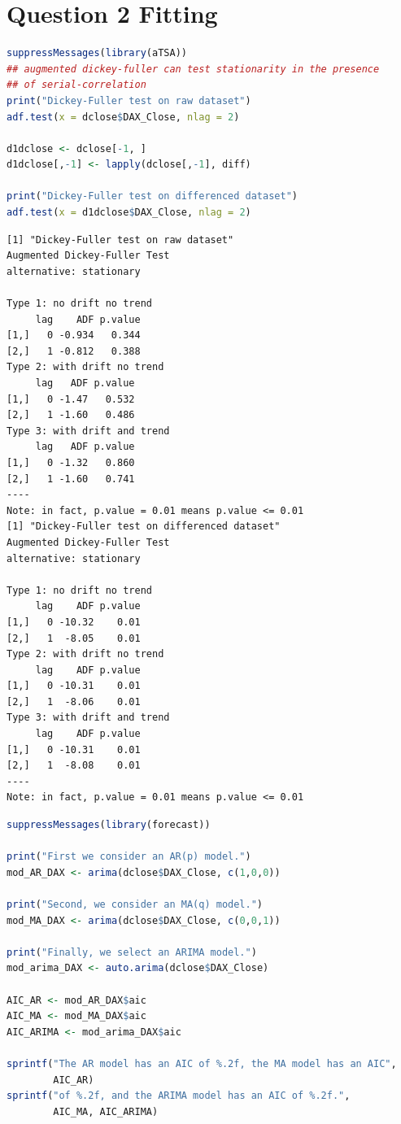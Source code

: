 \documentclass[a4paper]{article}
\begin{document}
\section{Question 2 Fitting}
\label{sec:orgae590e6}
\begin{lstlisting}[language=r,caption={Stationarity testing DAX prices and first difference},captionpos=b,numbers=none]
suppressMessages(library(aTSA))
## augmented dickey-fuller can test stationarity in the presence
## of serial-correlation
print("Dickey-Fuller test on raw dataset")
adf.test(x = dclose$DAX_Close, nlag = 2)

d1dclose <- dclose[-1, ]
d1dclose[,-1] <- lapply(dclose[,-1], diff)

print("Dickey-Fuller test on differenced dataset")
adf.test(x = d1dclose$DAX_Close, nlag = 2)
\end{lstlisting}

\label{org7155390}
\begin{verbatim}
[1] "Dickey-Fuller test on raw dataset"
Augmented Dickey-Fuller Test 
alternative: stationary 
 
Type 1: no drift no trend 
     lag    ADF p.value
[1,]   0 -0.934   0.344
[2,]   1 -0.812   0.388
Type 2: with drift no trend 
     lag   ADF p.value
[1,]   0 -1.47   0.532
[2,]   1 -1.60   0.486
Type 3: with drift and trend 
     lag   ADF p.value
[1,]   0 -1.32   0.860
[2,]   1 -1.60   0.741
---- 
Note: in fact, p.value = 0.01 means p.value <= 0.01 
[1] "Dickey-Fuller test on differenced dataset"
Augmented Dickey-Fuller Test 
alternative: stationary 
 
Type 1: no drift no trend 
     lag    ADF p.value
[1,]   0 -10.32    0.01
[2,]   1  -8.05    0.01
Type 2: with drift no trend 
     lag    ADF p.value
[1,]   0 -10.31    0.01
[2,]   1  -8.06    0.01
Type 3: with drift and trend 
     lag    ADF p.value
[1,]   0 -10.31    0.01
[2,]   1  -8.08    0.01
---- 
Note: in fact, p.value = 0.01 means p.value <= 0.01
\end{verbatim}

\begin{lstlisting}[language=r,label=lst:org8b74f89,caption={ARIMA fit on differenced DAX data},captionpos=b,numbers=none]
suppressMessages(library(forecast))

print("First we consider an AR(p) model.")
mod_AR_DAX <- arima(dclose$DAX_Close, c(1,0,0))

print("Second, we consider an MA(q) model.")
mod_MA_DAX <- arima(dclose$DAX_Close, c(0,0,1))

print("Finally, we select an ARIMA model.")
mod_arima_DAX <- auto.arima(dclose$DAX_Close)

AIC_AR <- mod_AR_DAX$aic
AIC_MA <- mod_MA_DAX$aic
AIC_ARIMA <- mod_arima_DAX$aic

sprintf("The AR model has an AIC of %.2f, the MA model has an AIC",
        AIC_AR)
sprintf("of %.2f, and the ARIMA model has an AIC of %.2f.",
        AIC_MA, AIC_ARIMA)
\end{lstlisting}
\end{document}
